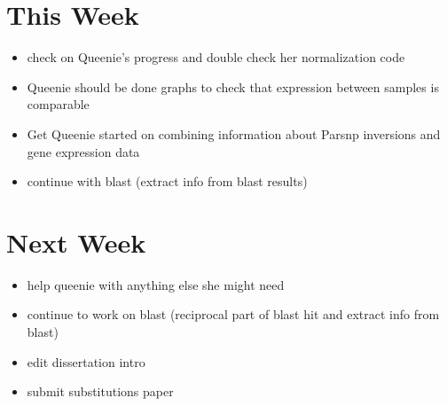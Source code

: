 \documentclass[12pt]{article}
\begin{document}

\section*{This Week}
%
\begin{itemize}
	\item check on Queenie's progress and double check her normalization code
	\item Queenie should be done graphs to check that expression between samples is comparable
	\item Get Queenie started on combining information about Parsnp inversions and gene expression data
	\item continue with blast (extract info from blast results)
\end{itemize}


\section*{Next Week}
\begin{itemize}
	\item help queenie with anything else she might need
	\item continue to work on blast (reciprocal part of blast hit and extract info from blast)
	\item edit dissertation intro
	\item submit substitutions paper
\end{itemize}

\newpage
\end{document}
